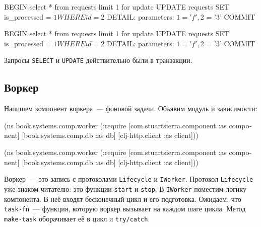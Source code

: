 
\ifnarrow

\begin{english}
  \begin{sql}
BEGIN
select * from requests
limit 1 for update
UPDATE requests SET is_processed = $1
WHERE id = $2
DETAIL:  parameters: $1 = 'f', $2 = '3'
COMMIT
  \end{sql}
\end{english}

\else

\begin{english}
  \begin{sql}
BEGIN
select * from requests limit 1 for update
UPDATE requests SET is_processed = $1 WHERE id = $2
DETAIL:  parameters: $1 = 'f', $2 = '3'
COMMIT
  \end{sql}
\end{english}

\fi

\noindent
Запросы \verb|SELECT| и \verb|UPDATE| действительно были в транзакции.

\subsection{Воркер}

Напишем компонент воркера~--- фоновой задачи. Объявим модуль и зависимости:

\ifnarrow

\begin{english}
  \begin{clojure}
(ns book.systems.comp.worker
  (:require
   [com.stuartsierra.component
    :as component]
   [book.systems.comp.db :as db]
   [clj-http.client :as client]))
  \end{clojure}
\end{english}

\else

\begin{english}
  \begin{clojure}
(ns book.systems.comp.worker
  (:require
   [com.stuartsierra.component :as component]
   [book.systems.comp.db :as db]
   [clj-http.client :as client]))
  \end{clojure}
\end{english}

\fi


Воркер~--- это запись с протоколами \verb|Lifecycle| и \verb|IWorker|. Протокол
\verb|Lifecycle| уже знаком читателю: это функции \verb|start| и \verb|stop|. В
\verb|IWorker| поместим логику компонента. В неё входят бесконечный цикл и его
подготовка. Ожидаем, что \verb|task-fn|~--- функция, которую воркер вызывает на
каждом шаге цикла. Метод \verb|make-task| оборачивает её в цикл и
\verb|try/catch|.

